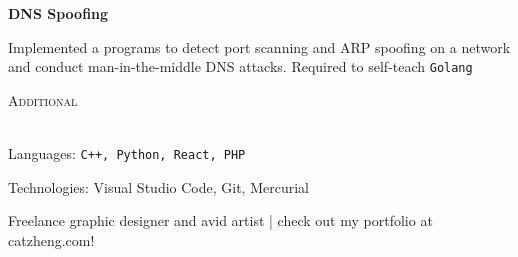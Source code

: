 \documentclass[a4paper, 11pt]{article}
\newcommand{\lineunder}{\vspace*{-8pt} \\ \hspace*{-20pt} \hrulefill \\}
\newcommand{\header}[1]{{\hspace*{-20pt}\vspace*{5pt} \large\textsc{#1}} \vspace*{-5pt} \lineunder}
\newenvironment{achievements}{\begin{list}{--}{\leftmargin 0pt \topsep 0pt \itemsep 1pt}}{\vspace*{3pt}\end{list}}
\begin{document}
{\hspace*{-17pt}\textbf{DNS Spoofing}}
\small
\vspace{2pt}
\begin{achievements}
\item Implemented a programs to detect port scanning and ARP spoofing on a network and conduct man-in-the-middle DNS attacks. Required to self-teach \texttt{Golang}
\end{achievements}

\vspace{2pt}
\header{Additional}
\begin{achievements}
\item Languages: \texttt{C++, Python, React, PHP}
\item Technologies: Visual Studio Code, Git, Mercurial
\item Freelance graphic designer and avid artist | check out my portfolio at catzheng.com!
\end{achievements}

\end{document}

